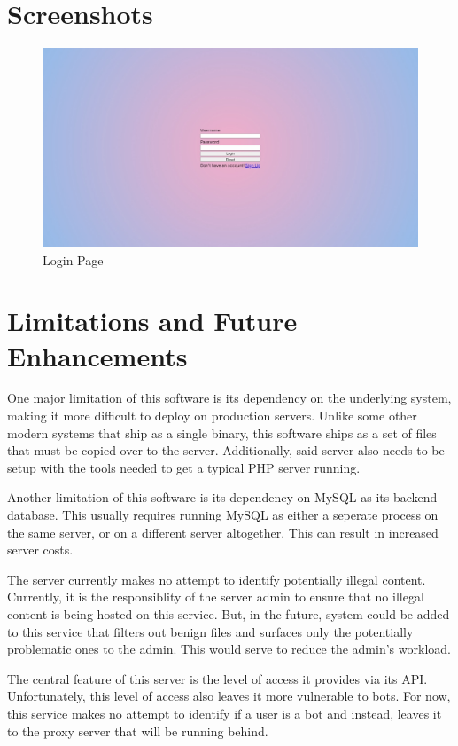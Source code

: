 \documentclass[12pt,a4paper]{report}
\begin{document}
\chapter{Screenshots}\label{cha:screenshots}
\begin{figure}[H]
	\includegraphics[width=\textwidth]{login-empty.jpeg}
	\caption{Login Page}
\end{figure}
\newpage
\chapter{Limitations and Future Enhancements}\label{cha:limitations_and_future_enhancements}
One major limitation of this software is its dependency on the underlying system, making it more difficult to deploy on production servers.
Unlike some other modern systems that ship as a single binary, this software ships as a set of files that must be copied over to the server.
Additionally, said server also needs to be setup with the tools needed to get a typical PHP server running.

Another limitation of this software is its dependency on MySQL as its backend database.
This usually requires running MySQL as either a seperate process on the same server, or on a different server altogether.
This can result in increased server costs.

The server currently makes no attempt to identify potentially illegal content.
Currently, it is the responsiblity of the server admin to ensure that no illegal content is being hosted on this service.
But, in the future, system could be added to this service that filters out benign files and surfaces only the potentially problematic ones to the admin.
This would serve to reduce the admin's workload.

The central feature of this server is the level of access it provides via its API.
Unfortunately, this level of access also leaves it more vulnerable to bots.
For now, this service makes no attempt to identify if a user is a bot and instead, leaves it to the proxy server that will be running behind.
\end{document}
